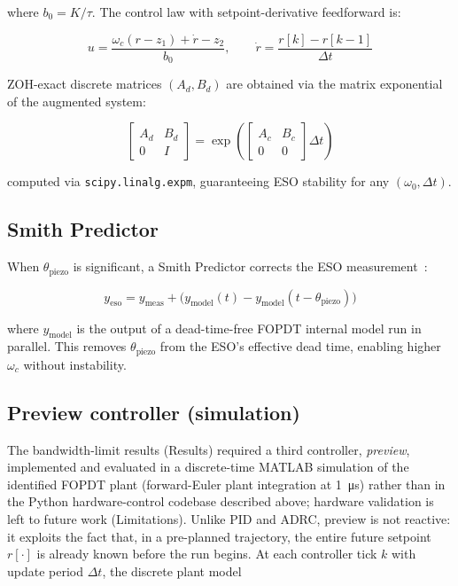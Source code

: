 \documentclass[fleqn,10pt]{wlscirep}
\begin{document}
where $b_0 = K/\tau$. The control law with setpoint-derivative feedforward is:

\begin{equation}
u = \frac{\omega_c(r - z_1) + \dot{r} - z_2}{b_0}, \qquad \dot{r} = \frac{r[k]-r[k-1]}{\Delta t}
\end{equation}

ZOH-exact discrete matrices $(A_d, B_d)$ are obtained via the matrix exponential of the augmented system:

\begin{equation}
\begin{bmatrix}A_d & B_d \\ 0 & I\end{bmatrix}
= \exp\!\left(\begin{bmatrix}A_c & B_c \\ 0 & 0\end{bmatrix}\Delta t\right)
\end{equation}

computed via \texttt{scipy.linalg.expm}, guaranteeing ESO stability for any $(\omega_0, \Delta t)$.

\subsection*{Smith Predictor}

When $\theta_\text{piezo}$ is significant, a Smith Predictor corrects the ESO measurement~\cite{smith1957smith}:

\begin{equation}
y_\text{eso} = y_\text{meas} + \bigl(y_\text{model}(t) - y_\text{model}(t-\theta_\text{piezo})\bigr)
\end{equation}

where $y_\text{model}$ is the output of a dead-time-free FOPDT internal model run in parallel. This removes $\theta_\text{piezo}$ from the ESO's effective dead time, enabling higher $\omega_c$ without instability.

\subsection*{Preview controller (simulation)}

The bandwidth-limit results (Results) required a third controller, \emph{preview}, implemented and evaluated in a discrete-time MATLAB simulation of the identified FOPDT plant (forward-Euler plant integration at \SI{1}{\micro s}) rather than in the Python hardware-control codebase described above; hardware validation is left to future work (Limitations). Unlike PID and ADRC, preview is not reactive: it exploits the fact that, in a pre-planned trajectory, the entire future setpoint $r[\cdot]$ is already known before the run begins. At each controller tick $k$ with update period $\Delta t$, the discrete plant model
\end{document}
